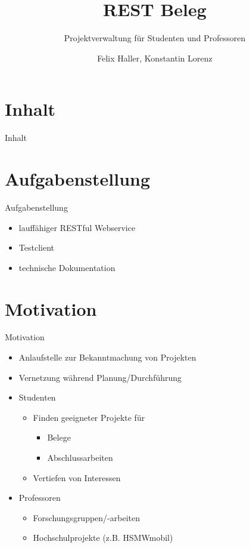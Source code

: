 \documentclass{beamer}
\author{Felix Haller, Konstantin Lorenz}
\title{REST Beleg}
\subtitle{Projektverwaltung für Studenten und Professoren}
\institute{IF13wI-B}
\date{}
\begin{document}
	\maketitle

	\nextframenocontents

	\section*{Inhalt}
	\begin{frame}{Inhalt}
		\tableofcontents
	\end{frame}
	\section{Aufgabenstellung}
		\begin{frame}{Aufgabenstellung}
			\begin{itemize}
				\item lauffähiger RESTful Webservice
				\item Testclient
				\item technische Dokumentation
			\end{itemize}
		\end{frame}
		
	\section{Motivation}
		\begin{frame}{Motivation}
			\begin{itemize}
				\item Anlaufstelle zur Bekanntmachung von Projekten
				\item Vernetzung während Planung/Durchführung
				\item Studenten
				\begin{itemize}
					\item Finden geeigneter Projekte für 
					\begin{itemize}
						\item Belege
						\item Abschlussarbeiten
					\end{itemize}
					\item Vertiefen von Interessen	
				\end{itemize}
				\item Professoren
				\begin{itemize}
					\item Forschungsgruppen/-arbeiten
					\item Hochschulprojekte (z.B. HSMWmobil)
				\end{itemize}
			\end{itemize}
		\end{frame}
		
\end{document}
